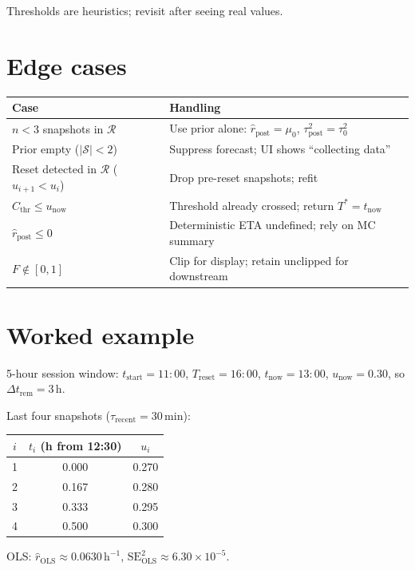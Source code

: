 \documentclass[11pt]{article}
\newcommand{\rpost}{\hat r_{\text{post}}}
\newcommand{\taupostsq}{\tau_{\text{post}}^2}
\newcommand{\tauzerosq}{\tau_0^2}
\newcommand{\rols}{\hat r_{\text{OLS}}}
\newcommand{\seolssq}{\mathrm{SE}_{\text{OLS}}^2}
\newcommand{\unow}{u_{\text{now}}}
\newcommand{\tnow}{t_{\text{now}}}
\newcommand{\Treset}{T_{\text{reset}}}
\newcommand{\Dtrem}{\Delta t_{\text{rem}}}
\newcommand{\Cthr}{C_{\text{thr}}}
\newcommand{\taurecent}{\tau_{\text{recent}}}
\newcommand{\Tstar}{T^\ast}
\begin{document}
Thresholds are heuristics; revisit after seeing real values.

\section{Edge cases}

\begin{center}
\begin{tabular}{@{}p{}p{}@{}}
\toprule
Case & Handling \\
\midrule
$n < 3$ snapshots in $\mathcal{R}$
  & Use prior alone: $\rpost = \mu_0$, $\taupostsq = \tauzerosq$ \\
Prior empty ($\lvert\mathcal{S}\rvert < 2$)
  & Suppress forecast; UI shows ``collecting data'' \\
Reset detected in $\mathcal{R}$ ($u_{i+1} < u_i$)
  & Drop pre-reset snapshots; refit \\
$\Cthr \leq \unow$
  & Threshold already crossed; return $\Tstar = \tnow$ \\
$\rpost \leq 0$
  & Deterministic ETA undefined; rely on MC summary \\
$F \notin [0, 1]$
  & Clip for display; retain unclipped for downstream \\
\bottomrule
\end{tabular}
\end{center}

\section{Worked example}

5-hour session window: $t_{\text{start}} = 11{:}00$, $\Treset = 16{:}00$,
$\tnow = 13{:}00$, $\unow = 0.30$, so $\Dtrem = 3$\,h.

Last four snapshots ($\taurecent = 30$\,min):

\begin{center}
\begin{tabular}{@{}ccc@{}}
\toprule
$i$ & $t_i$ (h from 12{:}30) & $u_i$ \\
\midrule
1 & 0.000 & 0.270 \\
2 & 0.167 & 0.280 \\
3 & 0.333 & 0.295 \\
4 & 0.500 & 0.300 \\
\bottomrule
\end{tabular}
\end{center}

OLS: $\rols \approx 0.0630\,\mathrm{h}^{-1}$, $\seolssq \approx 6.30 \times
10^{-5}$.
\end{document}
